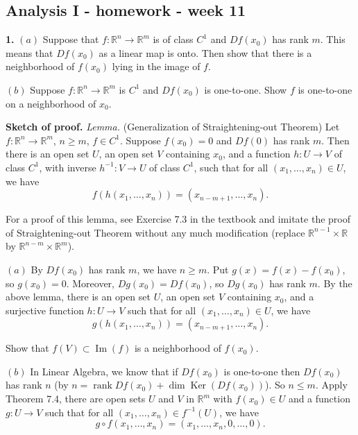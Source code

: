 \documentclass{article}
\begin{document}
    
    
    
    
    

    
    \subsection*{Analysis I - homework - week
11}\label{analysis-i---homework---week-11}

    \textbf{1.} $(a)$ Suppose that $f : \mathbb{R}^n \to \mathbb{R}^m$ is of
class $C^1$ and $Df (x_0 )$ has rank $m$. This means that $Df (x_0 )$ as
a linear map is onto. Then show that there is a neighborhood of $f(x_0)$
lying in the image of $f$.

$(b)$ Suppose $f : \mathbb{R}^n \to \mathbb{R}^m$ is $C^1$ and
$Df (x_0 )$ is one-to-one. Show $f$ is one-to-one on a neighborhood of
$x_0$.

    \textbf{Sketch of proof.} \emph{Lemma.} (Generalization of
Straightening-out Theorem) Let $f: \mathbb{R}^n \to \mathbb{R}^m$,
$n\ge m$, $f \in C^1$. Suppose $f(x_0) = 0$ and $Df(0)$ has rank $m$.
Then there is an open set $U$, an open set $V$ containing $x_0$, and a
function $h:U\to V$ of class $C^1$, with inverse $h^{-1}:V\to U$ of
class $C^1$, such that for all $(x_1,\ldots,x_n)\in U$, we have
\[f(h(x_1,\ldots,x_n)) = (x_{n-m+1},\ldots,x_n).\]

For a proof of this lemma, see Exercise 7.3 in the textbook and imitate
the proof of Straightening-out Theorem without any much modification
(replace $\mathbb{R}^{n-1}\times \mathbb{R}$ by
$\mathbb{R}^{n-m}\times \mathbb{R}^m$).

$(a)$ By $Df(x_0)$ has rank $m$, we have $n \ge m$. Put
$g(x) = f(x) - f(x_0)$, so $g(x_0) = 0$. Moreover, $Dg(x_0) = Df(x_0)$,
so $Dg(x_0)$ has rank $m$. By the above lemma, there is an open set $U$,
an open set $V$ containing $x_0$, and a surjective function $h:U\to V$
such that for all $(x_1,\ldots,x_n)\in U$, we have
\[g(h(x_1,\ldots,x_n)) = (x_{n-m+1},\ldots,x_n).\]

Show that $f(V)\subset \operatorname{Im}(f)$ is a neighborhood of
$f(x_0)$.

$(b)$ In Linear Algebra, we know that if $Df(x_0)$ is one-to-one then
$Df(x_0)$ has rank $n$ (by
$n = \operatorname{rank}Df(x_0) + \dim \operatorname{Ker}( Df(x_0))$).
So $n\le m$. Apply Theorem 7.4, there are open sets $U$ and $V$ in
$\mathbb{R}^m$ with $f(x_0)\in U$ and a function $g:U\to V$ such that
for all $(x_1,\ldots,x_n)\in f^{-1}(U)$, we have
\[g\circ  f(x_1,\ldots,x_n) = (x_1,\ldots,x_n,0,\ldots,0).\]
\end{document}
